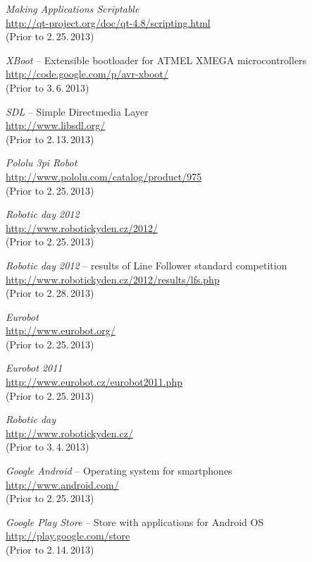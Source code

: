 \documentclass[12pt, a4paper, oneside]{article}
\newcommand{\It}{\textit}  %
\begin{document}
\begin{thebibliography}{99}
     \It{Making Applications Scriptable} \\
    \url{http://qt-project.org/doc/qt-4.8/scripting.html}\\
    (Prior to 2.\,25.\,2013)

     \It{XBoot} -- Extensible bootloader for ATMEL XMEGA microcontrollers \\
    \url{http://code.google.com/p/avr-xboot/}\\
    (Prior to 3.\,6.\,2013)

     \It{SDL} -- Simple Directmedia Layer \\
    \url{http://www.libsdl.org/}\\
    (Prior to 2.\,13.\,2013)

     \It{Pololu 3pi Robot} \\
    \url{http://www.pololu.com/catalog/product/975}\\
    (Prior to 2.\,25.\,2013)

     \It{Robotic day 2012} \\
    \url{http://www.robotickyden.cz/2012/}\\
    (Prior to 2.\,25.\,2013)

     \It{Robotic day 2012} -- results of Line Follower standard competition\\
    \url{http://www.robotickyden.cz/2012/results/lfs.php}\\
    (Prior to 2.\,28.\,2013)

     \It{Eurobot} \\
    \url{http://www.eurobot.org/}\\
    (Prior to 2.\,25.\,2013)

     \It{Eurobot 2011} \\
    \url{http://www.eurobot.cz/eurobot2011.php}\\
    (Prior to 2.\,25.\,2013)

     \It{Robotic day} \\
    \url{http://www.robotickyden.cz/}\\
    (Prior to 3.\,4.\,2013)

     \It{Google Android} -- Operating system for smartphones\\
    \url{http://www.android.com/}\\
    (Prior to 2.\,25.\,2013)

     \It{Google Play Store} -- Store with applications for Android OS\\
    \url{http://play.google.com/store}\\
    (Prior to 2.\,14.\,2013)


\end{thebibliography}
\end{document}
